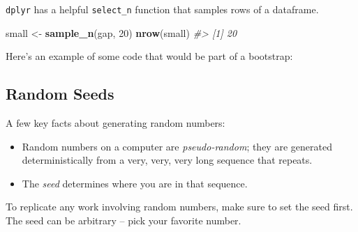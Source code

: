\documentclass[]{book}
\newenvironment{Shaded}{\begin{snugshade}}{\end{snugshade}}
\newcommand{\KeywordTok}[1]{\textcolor[rgb]{0.13,0.29,0.53}{\textbf{#1}}}
\newcommand{\DataTypeTok}[1]{\textcolor[rgb]{0.13,0.29,0.53}{#1}}
\newcommand{\DecValTok}[1]{\textcolor[rgb]{0.00,0.00,0.81}{#1}}
\newcommand{\StringTok}[1]{\textcolor[rgb]{0.31,0.60,0.02}{#1}}
\newcommand{\CommentTok}[1]{\textcolor[rgb]{0.56,0.35,0.01}{\textit{#1}}}
\newcommand{\OtherTok}[1]{\textcolor[rgb]{0.56,0.35,0.01}{#1}}
\newcommand{\OperatorTok}[1]{\textcolor[rgb]{0.81,0.36,0.00}{\textbf{#1}}}
\newcommand{\NormalTok}[1]{#1}
\providecommand{\tightlist}{%
  \setlength{\itemsep}{0pt}\setlength{\parskip}{0pt}}
\begin{document}
\texttt{dplyr} has a helpful \texttt{select\_n} function that samples
rows of a dataframe.

\begin{Shaded}
\begin{Highlighting}[]
\NormalTok{small <-}\StringTok{ }\KeywordTok{sample_n}\NormalTok{(gap, }\DecValTok{20}\NormalTok{)}
\KeywordTok{nrow}\NormalTok{(small)}
\CommentTok{#> [1] 20}
\end{Highlighting}
\end{Shaded}

Here's an example of some code that would be part of a bootstrap:

\begin{Shaded}
\end{Shaded}

\subsection{Random Seeds}\label{random-seeds}

A few key facts about generating random numbers:

\begin{itemize}
\tightlist
\item
  Random numbers on a computer are \emph{pseudo-random}; they are
  generated deterministically from a very, very, very long sequence that
  repeats.
\item
  The \emph{seed} determines where you are in that sequence.
\end{itemize}

To replicate any work involving random numbers, make sure to set the
seed first. The seed can be arbitrary -- pick your favorite number.
\end{document}
